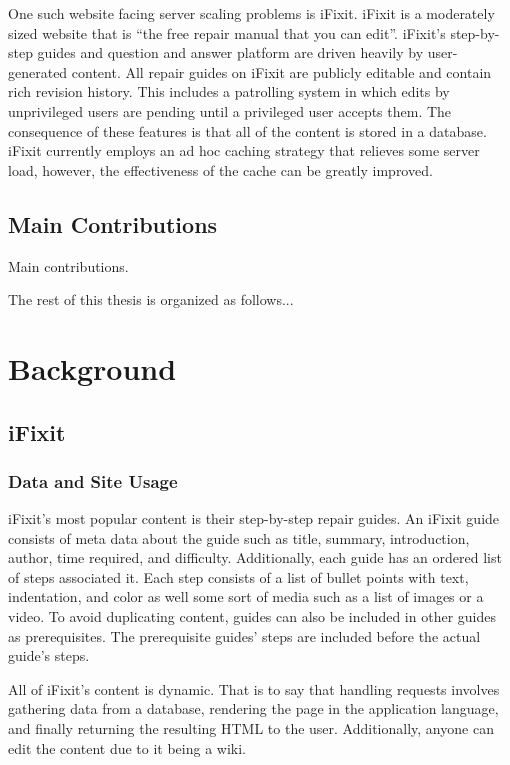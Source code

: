 \documentclass[12pt]{ucthesis}
\begin{document}
One such website facing server scaling problems is {\textsf iFixit}.
{\textsf iFixit} is a moderately sized website that is ``the free repair manual that you can edit''\cite{ifixitDotCom}.
{\textsf iFixit}'s step-by-step guides and question and answer platform are driven heavily by user-generated content.
All repair guides on iFixit are publicly editable and contain rich revision history.
This includes a patrolling system in which edits by unprivileged users are pending until a privileged user accepts them.
The consequence of these features is that all of the content is stored in a database.
{\textsf iFixit} currently employs an ad hoc caching strategy that relieves some server load, however, the effectiveness of the cache can be greatly improved.


\section{Main Contributions}
Main contributions.

The rest of this thesis is organized as follows...


\chapter{Background}
\label{background}


\section{iFixit}
\subsection{Data and Site Usage}
iFixit's most popular content is their step-by-step repair guides.
An iFixit guide consists of meta data about the guide such as title, summary, introduction, author, time required, and difficulty.
Additionally, each guide has an ordered list of steps associated it.
Each step consists of a list of bullet points with text, indentation, and color as well some sort of media such as a list of images or a video.
To avoid duplicating content, guides can also be included in other guides as prerequisites.
The prerequisite guides' steps are included before the actual guide's steps.

All of iFixit's content is dynamic.
That is to say that handling requests involves gathering data from a database, rendering the page in the application language, and finally returning the resulting HTML to the user.
Additionally, anyone can edit the content due to it being a wiki.
\end{document}
